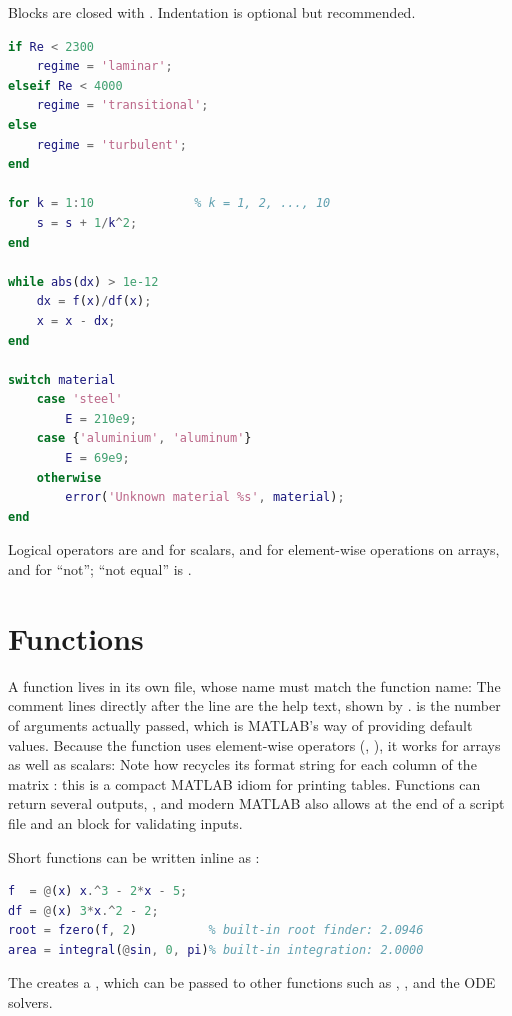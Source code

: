 Blocks are closed with . Indentation is optional but recommended.
\begin{lstlisting}[language=Matlab]
if Re < 2300
    regime = 'laminar';
elseif Re < 4000
    regime = 'transitional';
else
    regime = 'turbulent';
end

for k = 1:10              % k = 1, 2, ..., 10
    s = s + 1/k^2;
end

while abs(dx) > 1e-12
    dx = f(x)/df(x);
    x = x - dx;
end

switch material
    case 'steel'
        E = 210e9;
    case {'aluminium', 'aluminum'}
        E = 69e9;
    otherwise
        error('Unknown material %s', material);
end
\end{lstlisting}
Logical operators are \code{\&\&} and \code{||} for scalars, \code{\&} and \code{|} for
element-wise operations on arrays, and \code{\textasciitilde} for ``not''; ``not equal'' is
\code{\textasciitilde=}.

\section{Functions}

A function lives in its own file, whose name must match the function name:
The comment lines directly after the  line are the help text, shown by
.  is the number of arguments actually passed,
which is MATLAB's way of providing default values. Because the function uses element-wise
operators (, ), it works for arrays as well as scalars:
Note how  recycles its format string for each column of the matrix
\code{[masses; vt]}: this is a compact MATLAB idiom for printing tables. Functions can return
several outputs, , and modern MATLAB also allows
 at the end of a script file and an  block for
validating inputs.

Short functions can be written inline as :
\begin{lstlisting}[language=Matlab]
f  = @(x) x.^3 - 2*x - 5;
df = @(x) 3*x.^2 - 2;
root = fzero(f, 2)          % built-in root finder: 2.0946
area = integral(@sin, 0, pi)% built-in integration: 2.0000
\end{lstlisting}
The  creates a , which can be passed to other functions such
as , ,  and the ODE solvers.


